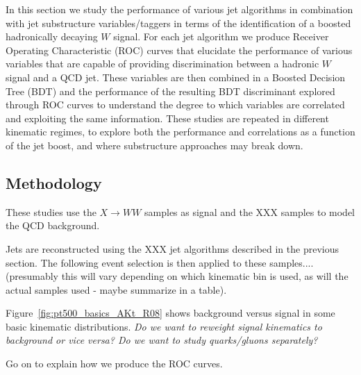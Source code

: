 In this section we study the performance of various jet algorithms in
combination with jet substructure variables/taggers in terms of the
identification of a boosted hadronically decaying $W$ signal. For each
jet algorithm we produce Receiver Operating Characteristic (ROC)
curves that elucidate the performance of various variables that are
capable of providing discrimination between a hadronic $W$ signal and
a QCD jet. These variables are then combined in a Boosted Decision Tree (BDT) and the performance of the resulting BDT discriminant
explored through ROC curves to understand the degree to which
variables are correlated and exploiting the same information. These
studies are repeated in different kinematic regimes, to explore both
the performance and correlations as a function of the jet boost, and
where substructure approaches may break down.

\subsection{Methodology}

These studies use the $X \rightarrow WW$ samples as signal and the XXX
samples to model the QCD background. 

Jets are reconstructed using the XXX jet algorithms described in the
previous section. The following event selection is then applied to these
samples....(presumably this will vary depending on which kinematic bin
is used, as will the actual samples used - maybe summarize in a table).

Figure~\ref{fig:pt500_basics_AKt_R08} shows
background versus signal in some basic kinematic
distributions. {\it Do we want to reweight signal kinematics to
background or vice versa? Do we want to study quarks/gluons separately?}

Go on to explain how we produce the ROC curves.

